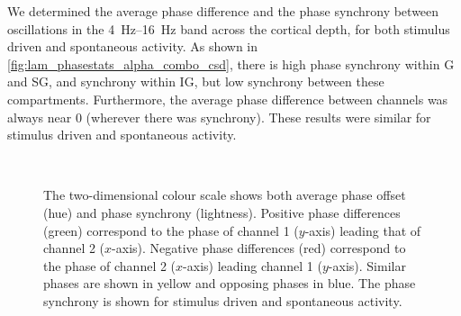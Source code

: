 

We determined the average phase difference and the phase synchrony between oscillations in the \SIrange{4}{16}{Hz} band across the cortical depth, for both stimulus driven and spontaneous activity.
As shown in \autoref{fig:lam_phasestats_alpha_combo_csd}, there is high phase synchrony within \ac{G} and \ac{SG}, and synchrony within \ac{IG}, but low synchrony between these compartments.
Furthermore, the average phase difference between channels was always near $0$ (wherever there was synchrony).
These results were similar for stimulus driven and spontaneous activity.

\begin{figure}[tbp]
    \centering
    \\
    \caption{
The two-dimensional colour scale shows both average phase offset (hue) and phase synchrony (lightness).
Positive phase differences (green) correspond to the phase of channel 1 ($y$-axis) leading that of channel 2 ($x$-axis).
Negative phase differences (red) correspond to the phase of channel 2 ($x$-axis) leading channel 1 ($y$-axis).
Similar phases are shown in yellow and opposing phases in blue.
The phase synchrony is shown for stimulus driven \protect{} and spontaneous \protect{} activity.
}
\label{fig:lam_phasestats_alpha_combo_csd}
\end{figure}


